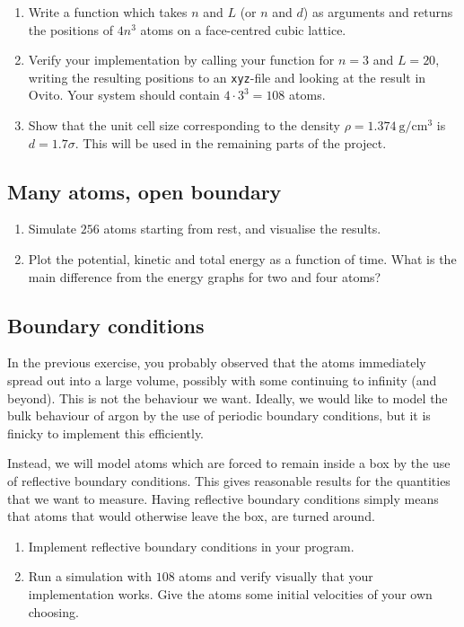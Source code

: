 \documentclass[11pt,british,a4paper]{report}
\begin{document}
\begin{enumerate}[label=\roman*.]
    \item Write a function which takes \(n\) and \(L\) (or \(n\) and \(d\)) as arguments and returns the positions of \(4n^3\) atoms on a face-centred cubic lattice.
    \item Verify your implementation by calling your function for \(n=3\) and \(L = 20\), writing the resulting positions to an \texttt{xyz}-file and looking at the result in Ovito. Your system should contain \(4\cdot3^3=108\) atoms.
    \item Show that the unit cell size corresponding to the density \(\rho=\SI{1.374}{\gram\per\cm\tothe3}\) is \(d=1.7 \sigma\). This will be used in the remaining parts of the project.
\end{enumerate}

\subsection{Many atoms, open boundary}
\begin{enumerate}[label=\roman*.]
    \item Simulate \(256\) atoms starting from rest, and visualise the results.
    \item Plot the potential, kinetic and total energy as a function of time. What is the main difference from the energy graphs for two and four atoms?
\end{enumerate}

\subsection{Boundary conditions}
In the previous exercise, you probably observed that the atoms immediately spread out into a large volume, possibly with some continuing to infinity (and beyond). This is not the behaviour we want. Ideally, we would like to model the bulk behaviour of argon by the use of periodic boundary conditions, but it is finicky to implement this efficiently.

Instead, we will model atoms which are forced to remain inside a box by the use of reflective boundary conditions. This gives reasonable results for the quantities that we want to measure.
Having reflective boundary conditions simply means that atoms that would otherwise leave the box, are turned around.
\begin{enumerate}[label=\roman*.]
    \item Implement reflective boundary conditions in your program.
    \item Run a simulation with \(108\) atoms and verify visually that your implementation works. Give the atoms some initial velocities of your own choosing.
\end{enumerate}
\end{document}
